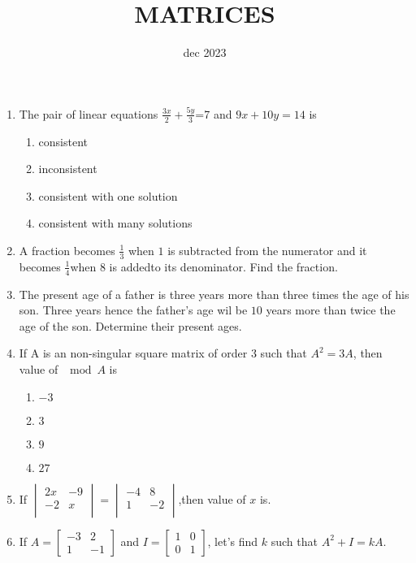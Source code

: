 \documentclass[12pt,-letter paper]{article}
\title{MATRICES}
\author{}
\date{dec 2023}
\begin{document}
\maketitle

\begin{enumerate}
\item The pair of linear equations
$\frac{3x}{2}+\frac{5y}{3}$=7 and $9x+10y=14$ is\\
\begin{enumerate}[label=(\alph*)]
\item consistent
\item inconsistent
\item consistent with one solution 
\item consistent with many solutions 
\end{enumerate}


\item A fraction becomes $\frac{1}{3}$ when $1$ is subtracted from the numerator and it becomes $\frac{1}{4}$when $8$ is  addedto its denominator. Find the fraction.


\item The present age of a father is three years more than three times the age of his son. Three years hence the father's age wil be $10$ years more than twice the age of the son. Determine their present ages.

\item If A is an non-singular square matrix  of order 3 such that $A^2=3A$, then value of $\mod{A}$ is\\
\begin{enumerate}[label=(\alph*)]
\item $-3$
\item $3$
\item $9$
\item $27$
\end{enumerate}

\item If $\begin{vmatrix} 2x &-9\\ -2 &x\\ \end{vmatrix}=\begin{vmatrix} -4 &8\\ 1 &-2\\ \end{vmatrix}$,then value of $x$ is. 
		
\item If  \(A = \begin{bmatrix} -3 & 2 \\ 1 & -1 \end{bmatrix}\) and \(I = \begin{bmatrix} 1 & 0 \\ 0 & 1 \end{bmatrix}\), let's find $k$ such that $A^2 + I = kA$.


\end{enumerate}
\end{document}
